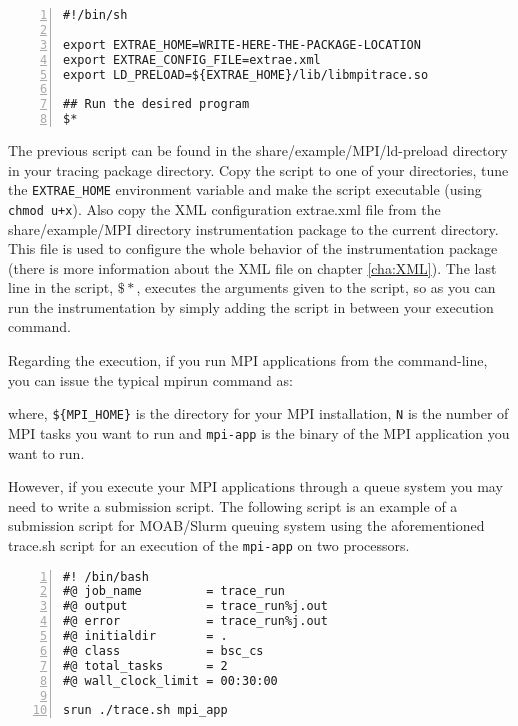 \begin{Verbatim}[frame=single,numbers=left,labelposition=topline,label=trace.sh]
#!/bin/sh

export EXTRAE_HOME=WRITE-HERE-THE-PACKAGE-LOCATION
export EXTRAE_CONFIG_FILE=extrae.xml
export LD_PRELOAD=${EXTRAE_HOME}/lib/libmpitrace.so

## Run the desired program
$*
\end{Verbatim}

The previous script can be found in the share/example/MPI/ld-preload directory in your tracing package directory. Copy the script to one of your directories, tune the {\tt EXTRAE\_HOME} environment variable and make the script executable (using {\tt chmod u+x}). Also copy the XML configuration extrae.xml file from the share/example/MPI directory instrumentation package to the current directory. This file is used to configure the whole behavior of the instrumentation package (there is more information about the XML file on chapter \ref{cha:XML}). The last line in the script, $\$\ast$, executes the arguments given to the script, so as you can run the instrumentation by simply adding the script in between your execution command.

Regarding the execution, if you run MPI applications from the command-line, you can issue the typical mpirun command as:


where, {\tt \$\{MPI\_HOME\}} is the directory for your MPI installation, {\tt N} is the number of MPI tasks you want to run and {\tt mpi-app} is the binary of the MPI application you want to run.

However, if you execute your MPI applications through a queue system you may need to write a submission script. The following script is an example of a submission script for MOAB/Slurm queuing system using the aforementioned trace.sh script for an execution of the {\tt mpi-app} on two processors.

\begin{Verbatim}[frame=single,numbers=left,labelposition=topline,label=slurm-trace.sh]
#! /bin/bash
#@ job_name         = trace_run
#@ output           = trace_run%j.out
#@ error            = trace_run%j.out
#@ initialdir       = .
#@ class            = bsc_cs
#@ total_tasks      = 2
#@ wall_clock_limit = 00:30:00

srun ./trace.sh mpi_app 
\end{Verbatim}

